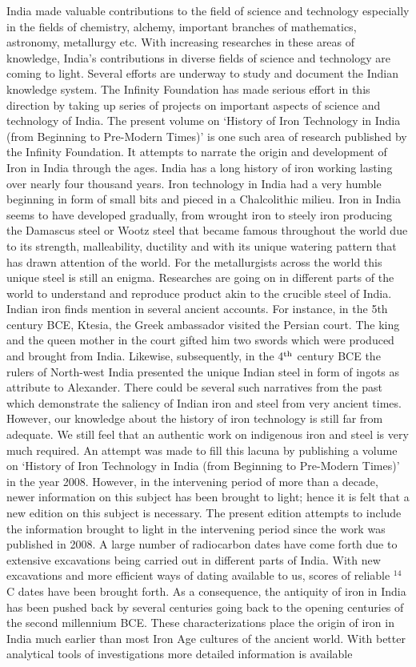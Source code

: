 India made valuable contributions to the field of science and technology especially in the fields of chemistry, alchemy, important branches of mathematics, astronomy, metallurgy etc. With increasing researches in these areas of knowledge, India’s contributions in diverse fields of science and technology are coming to light. Several efforts are underway to study and document the Indian knowledge system. The Infinity Foundation has made serious effort in this direction by taking up series of projects on important aspects of science and technology of India. The present volume on ‘History of Iron Technology in India (from Beginning to Pre-Modern Times)’ is one such area of research published by the Infinity Foundation. It attempts to narrate the origin and development of Iron in India through the ages. India has a long history of iron working lasting over nearly four thousand years. Iron technology in India had a very humble beginning in form of small bits and pieced in a Chalcolithic milieu. Iron in India seems to have developed gradually, from wrought iron to steely iron producing the Damascus steel or Wootz steel that became famous throughout the world due to its strength, malleability, ductility and with its unique watering pattern that has drawn attention of the world. For the metallurgists across the world this unique steel is still an enigma. Researches are going on in different parts of the world to understand and reproduce product akin to the crucible steel of India. Indian iron finds mention in several ancient accounts. For instance, in the 5th century BCE, Ktesia, the Greek ambassador visited the Persian court. The king and the queen mother in the court gifted him two swords which were produced and brought from India. Likewise, subsequently, in the 4$^{\rm th}$ century BCE the rulers of North-west India presented the unique Indian steel in form of ingots as attribute to Alexander. There could be several such narratives from the past which demonstrate the saliency of Indian iron and steel from very ancient times. However, our knowledge about the history of iron technology is still far from adequate. We still feel that an authentic work on indigenous iron and steel is very much required. An attempt was made to fill this lacuna by publishing a volume on ‘History of Iron Technology in India (from Beginning to Pre-Modern Times)’ in the year 2008. However, in the intervening period of more than a decade, newer information on this subject has been brought to light; hence it is felt that a new edition on this subject is necessary. The present edition attempts to include the information brought to light in the intervening period since the work was published in 2008. A large number of radiocarbon dates have come forth due to extensive excavations being carried out in different parts of India. With new excavations and more efficient ways of dating available to us, scores of reliable $^{14}$C dates have been brought forth. As a consequence, the antiquity of iron in India has been pushed back by several centuries going back to the opening centuries of the second millennium BCE. These characterizations place the origin of iron in India much earlier than most Iron Age cultures of the ancient world. With better analytical tools of investigations more detailed information is available 